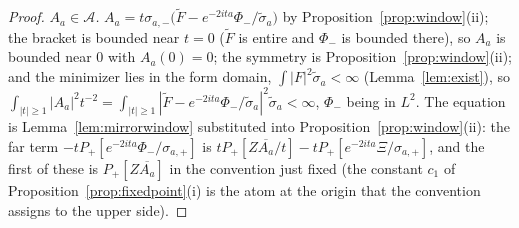 \documentclass[11pt]{article}
\theoremstyle{definition}
\theoremstyle{remark}
\begin{document}
\begin{proof}
\emph{$A_a\in\mathcal A$.} $A_a=t\sigma_{a,-}\big(\tilde F-e^{-2ita}\Phi_-/\tilde\sigma_a\big)$ by Proposition~\ref{prop:window}(ii); the bracket is bounded near $t=0$ ($\tilde F$ is entire and $\Phi_-$ is bounded there), so $A_a$ is bounded near $0$ with $A_a(0)=0$; the symmetry is Proposition~\ref{prop:window}(ii); and the minimizer lies in the form domain, $\int|F|^2\tilde\sigma_a<\infty$ (Lemma~\ref{lem:exist}), so $\int_{|t|\ge1}|A_a|^2t^{-2}=\int_{|t|\ge1}|\tilde F-e^{-2ita}\Phi_-/\tilde\sigma_a|^2\tilde\sigma_a<\infty$, $\Phi_-$ being in $L^2$. The equation is Lemma~\ref{lem:mirrorwindow} substituted into Proposition~\ref{prop:window}(ii): the far term $-tP_+[e^{-2ita}\Phi_-/\sigma_{a,+}]$ is $tP_+[Z\overline{A_a}/t]-tP_+[e^{-2ita}\Xi/\sigma_{a,+}]$, and the first of these is $P_+[Z\overline{A_a}]$ in the convention just fixed (the constant $c_1$ of Proposition~\ref{prop:fixedpoint}(i) is the atom at the origin that the convention assigns to the upper side).


\end{proof}
\end{document}
